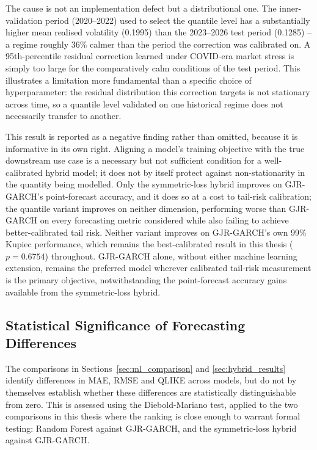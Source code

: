 \documentclass[12pt,a4paper]{article}
\begin{document}
The cause is not an implementation defect but a distributional one. The inner-validation period
(2020--2022) used to select the quantile level has a substantially higher mean realised volatility
(0.1995) than the 2023--2026 test period (0.1285) -- a regime roughly 36\% calmer than the period
the correction was calibrated on. A 95th-percentile residual correction learned under COVID-era
market stress is simply too large for the comparatively calm conditions of the test period. This
illustrates a limitation more fundamental than a specific choice of hyperparameter: the residual
distribution this correction targets is not stationary across time, so a quantile level validated
on one historical regime does not necessarily transfer to another.

This result is reported as a negative finding rather than omitted, because it is informative in its
own right. Aligning a model's training objective with the true downstream use case is a necessary
but not sufficient condition for a well-calibrated hybrid model; it does not by itself protect
against non-stationarity in the quantity being modelled. Only the symmetric-loss hybrid improves on
GJR-GARCH's point-forecast accuracy, and it does so at a cost to tail-risk calibration; the quantile
variant improves on neither dimension, performing worse than GJR-GARCH on every forecasting metric
considered while also failing to achieve better-calibrated tail risk. Neither variant improves on
GJR-GARCH's own 99\% Kupiec performance, which remains the best-calibrated result in this thesis
($p=0.6754$) throughout. GJR-GARCH alone, without either machine learning extension, remains the
preferred model wherever calibrated tail-risk measurement is the primary objective, notwithstanding
the point-forecast accuracy gains available from the symmetric-loss hybrid.

\subsection{Statistical Significance of Forecasting Differences}\label{sec:dm}
The comparisons in Sections~\ref{sec:ml_comparison} and \ref{sec:hybrid_results} identify
differences in MAE, RMSE and QLIKE across models, but do not by themselves establish whether these
differences are statistically distinguishable from zero. This is assessed using the
Diebold-Mariano test, applied to the two comparisons in this thesis where the ranking is close
enough to warrant formal testing: Random Forest against GJR-GARCH, and the symmetric-loss hybrid
against GJR-GARCH.
\end{document}
